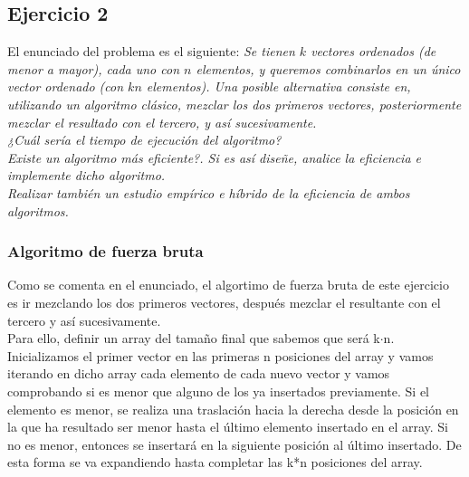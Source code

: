 \documentclass[10pt,a4paper]{article}
\begin{document}
\subsection{Ejercicio 2}
El enunciado del problema es el siguiente: \textit{Se tienen \(k\) vectores ordenados (de menor a mayor), cada uno con \(n\) elementos, y queremos combinarlos
en un único vector ordenado (con \(kn\) elementos). Una posible alternativa consiste en, utilizando un algoritmo clásico, mezclar los dos primeros vectores, posteriormente mezclar el resultado con el tercero, y así sucesivamente.}
\\
\textit{¿Cuál sería el tiempo de ejecución del algoritmo?}
\\
\textit{Existe un algoritmo más eficiente?. Si es así diseñe, analice la eficiencia e implemente dicho algoritmo.}
\\
\textit{Realizar también un estudio empírico e híbrido de la eficiencia de ambos algoritmos.}
\subsubsection{Algoritmo de fuerza bruta}
Como se comenta en el enunciado, el algortimo de fuerza bruta de este ejercicio es ir mezclando los dos primeros vectores, después mezclar el resultante con el tercero y así sucesivamente. \\

Para ello, definir un array del tamaño final que sabemos que será k$\cdot$n. Inicializamos el primer vector en las primeras n posiciones del array y vamos iterando en dicho array cada elemento de cada nuevo vector y vamos comprobando si es menor que alguno de los ya insertados previamente. Si el elemento es menor, se realiza una traslación hacia la derecha desde la posición en la que ha resultado ser menor hasta el último elemento insertado en el array. Si no es menor, entonces se insertará en la siguiente posición al último insertado. De esta forma se va expandiendo hasta completar las k*n posiciones del array.
\\
\end{document}
